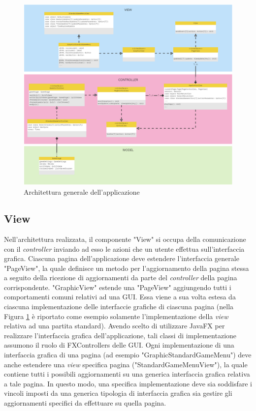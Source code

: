     \begin{figure}[H]
        \centering
        \includegraphics[width=\textwidth]{Miro/general_architecture.png}
        \caption{Architettura generale dell'applicazione}
        \label{fig:mvc-generale}
    \end{figure}
    
    \subsection{View}
        Nell'architettura realizzata, il componente "View" si occupa della comunicazione con il \textit{controller} inviando ad esso le azioni che un utente effettua sull'interfaccia grafica. Ciascuna pagina dell'applicazione deve estendere l'interfaccia generale "PageView", la quale definisce un metodo per l'aggiornamento della pagina stessa a seguito della ricezione di aggiornamenti da parte del \textit{controller} della pagina corrispondente. "GraphicView" estende una "PageView" aggiungendo tutti i comportamenti comuni relativi ad una GUI. Essa viene a sua volta estesa da ciascuna implementazione delle interfaccie grafiche di ciascuna pagina (nella Figura \ref{fig:mvc-generale} è riportato come esempio solamente l'implementazione della \textit{view} relativa ad una partita standard). Avendo scelto di utilizzare JavaFX per realizzare l'interfaccia grafica dell'applicazione, tali classi di implementazione assumono il ruolo di FXControllers delle GUI. Ogni implementazione di una interfaccia grafica di una pagina (ad esempio "GraphicStandardGameMenu") deve anche estendere una \textit{view} specifica pagina ("StandardGameMenuView"), la quale contiene tutti i possibili aggiornamenti su una generica interfaccia grafica relativa a tale pagina. In questo modo, una specifica implementazione deve sia soddisfare i vincoli imposti da una generica tipologia di interfaccia grafica sia gestire gli aggiornamenti specifici da effettuare su quella pagina.
        
